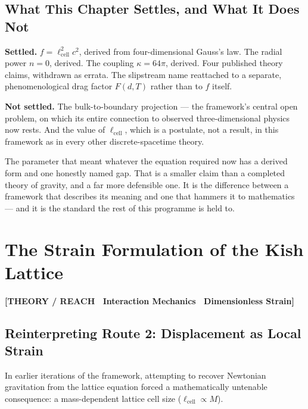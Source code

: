 \documentclass[11pt, letterpaper, openany]{book}
\begin{document}
\section{What This Chapter Settles, and What It Does Not}

\begin{signalbox}
\textbf{Settled.} $f = \ell_{\mathrm{cell}}^2 c^2$, derived from four-dimensional Gauss's law. The
radial power $n = 0$, derived. The coupling $\kappa = 64\pi$, derived. Four published theory claims,
withdrawn as errata. The slipstream name reattached to a separate, phenomenological drag factor
$F(d,T)$ rather than to $f$ itself.

\medskip
\textbf{Not settled.} The bulk-to-boundary projection --- the framework's central open problem, on
which its entire connection to observed three-dimensional physics now rests. And the value of
$\ell_{\mathrm{cell}}$, which is a postulate, not a result, in this framework as in every other
discrete-spacetime theory.
\end{signalbox}

The parameter that meant whatever the equation required now has a derived form and one honestly
named gap. That is a smaller claim than a completed theory of gravity, and a far more defensible one.
It is the difference between a framework that describes its meaning and one that hammers it to
mathematics --- and it is the standard the rest of this programme is held to.

\chapter{The Strain Formulation of the Kish Lattice}

\begin{center}
{\color{theorytag}\textbf{[THEORY / REACH \textbullet\ Interaction Mechanics \textbullet\ Dimensionless Strain]}}
\end{center}

\section{Reinterpreting Route 2: Displacement as Local Strain}

In earlier iterations of the framework, attempting to recover Newtonian gravitation from the lattice equation forced a mathematically untenable consequence: a mass-dependent lattice cell size ($\ell_{\text{cell}} \propto M$). 
\end{document}
